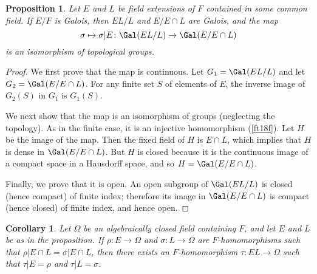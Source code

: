 \documentclass[a4paper,11pt,final,openany]{memoir}
\newtheorem{corollary}[X]{Corollary}
\newtheorem{proposition}[X]{Proposition}
\theoremstyle{nonumberplain}
\newtheorem{proof}{Proof.}
\begin{document}
\noindent\begin{minipage}{4.0in}
\begin{proposition}
\label{ig8}Let $E$ and $L$ be field extensions of $F$ contained in some common
field. If $E/F$ is Galois, then $EL/L$ and $E/E\cap L$ are Galois, and the map%
\[
\sigma\mapsto\sigma|E\colon\Gal(EL/L)\rightarrow\Gal(E/E\cap L)
\]
is an isomorphism of topological groups.
\end{proposition}
\end{minipage}
\begin{minipage}{1.5in}
\end{minipage}


\begin{proof}
We first prove that the map is continuous. Let $G_{1}=\Gal(EL/L)$ and let
$G_{2}=\Gal(E/E\cap L)$. For any finite set $S$ of elements of $E$, the
inverse image of $G_{2}(S)$ in $G_{1}$ is $G_{1}(S)$.

We next show that the map is an isomorphism of groups (neglecting the
topology). As in the finite case, it is an injective homomorphism
(\ref{ft18f}). Let $H$ be the image of the map. Then the fixed field of $H$ is
$E\cap L$, which implies that $H$ is dense in $\Gal(E/E\cap L)$. But $H$ is
closed because it is the continuous image of a compact space in a Hausdorff
space, and so $H=\Gal(E/E\cap L)$.

Finally, we prove that it is open. An open subgroup of $\Gal(EL/L)$ is closed
(hence compact) of finite index; therefore its image in $\Gal(E/E\cap L)$ is
compact (hence closed) of finite index, and hence open.
\end{proof}

\begin{corollary}
\label{ig9}Let $\Omega$ be an algebraically closed field containing $F$, and
let $E$ and $L$ be as in the proposition. If $\rho\colon E\rightarrow\Omega$
and $\sigma\colon L\rightarrow\Omega$ are $F$-homomorphisms such that
$\rho|E\cap L=\sigma|E\cap L$, then there exists an $F$-homomorphism
$\tau\colon EL\rightarrow\Omega$ such that $\tau|E=\rho$ and $\tau|L=\sigma$.
\end{corollary}
\end{document}
